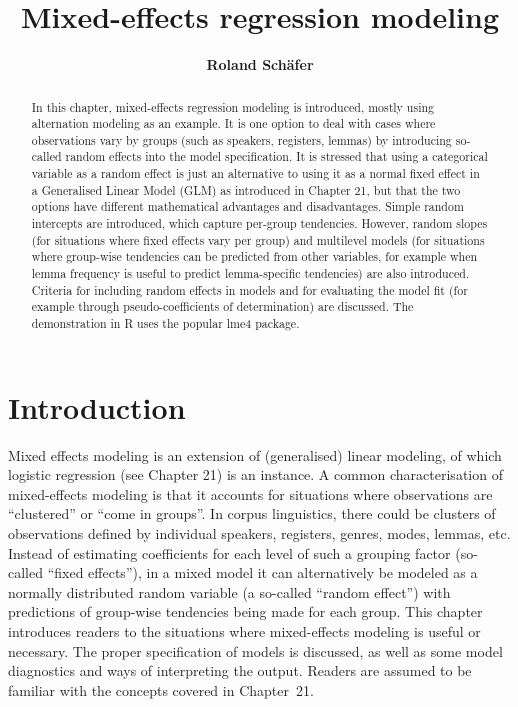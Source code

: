 \documentclass[graybox]{svmult}
\title{Mixed-effects regression modeling}
\author{\bf Roland Schäfer}
\institute{Roland Schäfer \at Deutsche und niederländische Philologie, Freie Universität Berlin \email{roland.schaefer@fu-berlin.de}}
\begin{document}
       

\raggedright

\setcounter{chapter}{21}
\renewcommand*\thesection{\arabic{chapter}.\arabic{section}}

\maketitle

\begin{abstract}{In this chapter, mixed-effects regression modeling is introduced, mostly using alternation modeling as an example.
  It is one option to deal with cases where observations vary by groups (such as speakers, registers, lemmas) by introducing so-called random effects into the model specification.
  It is stressed that using a categorical variable as a random effect is just an alternative to using it as a normal fixed effect in a Generalised Linear Model (GLM) as introduced in Chapter 21, but that the two options have different mathematical advantages and disadvantages.
  Simple random intercepts are introduced, which capture per-group tendencies.
  However, random slopes (for situations where fixed effects vary per group) and multilevel models (for situations where group-wise tendencies can be predicted from other variables, for example when lemma frequency is useful to predict lemma-specific tendencies) are also introduced.
  Criteria for including random effects in models and for evaluating the model fit (for example through pseudo-coefficients of determination) are discussed.
The demonstration in R uses the popular lme4 package.}
  \end{abstract}

\section{Introduction}
\label{sec:introduction}

Mixed effects modeling is an extension of (generalised) linear modeling, of which logistic regression (see Chapter 21) is an instance.
A common characterisation of mixed-effects modeling is that it accounts for situations where observations are ``clustered'' or ``come in groups''.
In corpus linguistics, there could be clusters of observations defined by individual speakers, registers, genres, modes, lemmas, etc.
Instead of estimating coefficients for each level of such a grouping factor (so-called ``fixed effects''), in a mixed model it can alternatively be modeled as a normally distributed random variable (a so-called ``random effect'') with predictions of group-wise tendencies being made for each group.
This chapter introduces readers to the situations where mixed-effects modeling is useful or necessary.
The proper specification of models is discussed, as well as some model diagnostics and ways of interpreting the output.
Readers are assumed to be familiar with the concepts covered in Chapter~21.
\end{document}
